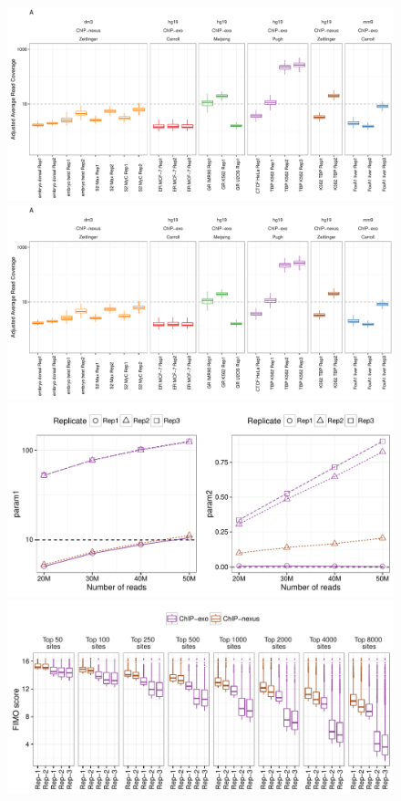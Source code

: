 \documentclass{bmcart}
\begin{document}

\newpage


\begin{figure}[h!]
  \centering
  \includegraphics[width = .9  \textwidth,page = 1]{figures/fig5/QC_pipeline_eval_boxplot.pdf}
\newline
  \includegraphics[width = .9  \textwidth,page = 2]{figures/fig5/QC_pipeline_eval_boxplot.pdf}
\newline
\includegraphics[width = .45\textwidth,page = 1]{figures/fig5/TBP_param_depth_trend.pdf}
\includegraphics[width = .5\textwidth]{figures/fig5/TBP_scores_comparison.pdf}

\end{figure}
\end{document}
